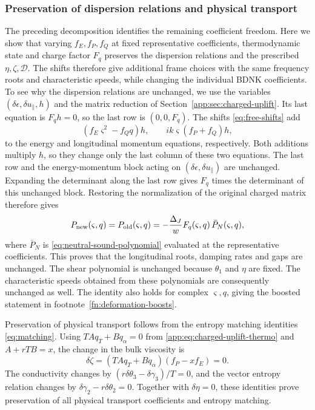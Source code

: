 \subsubsection*{Preservation of dispersion relations and physical transport}
The preceding decomposition identifies the remaining coefficient
freedom. Here we show that varying $f_E,f_P,f_Q$ at fixed representative
coefficients, thermodynamic state and charge factor $F_q$ preserves
the dispersion relations and the prescribed $\eta,\zeta,\mathcal D$.
The shifts therefore give additional frame choices with the same
frequency roots and characteristic speeds, while changing the
individual BDNK coefficients. To see why the dispersion relations are
unchanged, we use the variables $(\delta\epsilon,\delta u_\parallel,h)$
and the matrix reduction of Section~\ref{app:sec:charged-uplift}. Its last equation is $F_qh=0$,
so the last row is $(0,0,F_q)$. The shifts \eqref{eq:free-shifts} add
\begin{equation}
 (f_E\varsigma^2-f_Qq)h,\qquad
 ik\varsigma(f_P+f_Q)h,
\end{equation}
to the energy and longitudinal momentum equations, respectively.
Both additions multiply $h$, so they change only the last column of
these two equations. The last row and the energy-momentum block
acting on $(\delta\epsilon,\delta u_\parallel)$ are unchanged.
Expanding the determinant along the last row gives $F_q$ times the
determinant of this unchanged block. Restoring the normalization of the
original charged matrix therefore gives
\begin{equation}\label{app:eq:hierarchy-isospectral}
 P_{\rm new}(\varsigma,q)=P_{\rm old}(\varsigma,q)
   =-\frac{\Delta_J} w F_q(\varsigma,q)\,\bar P_N(\varsigma,q),
\end{equation}
where $\bar P_N$ is \eqref{eq:neutral-sound-polynomial} evaluated at the
representative coefficients. This proves that the longitudinal roots,
damping rates and gaps are unchanged. The shear polynomial is unchanged
because $\theta_1$ and $\eta$ are fixed. The characteristic speeds obtained
from these polynomials are consequently unchanged as well. The identity also holds for
complex $\varsigma,q$, giving the boosted statement in
footnote~\ref{fn:deformation-boosts}.

Preservation of physical transport follows from the
entropy matching identities \eqref{eq:matching}. Using
$TAq_T+Bq_\alpha=0$ from \eqref{app:eq:charged-uplift-thermo}
and $A+rTB=x$, the change in the bulk viscosity is
\begin{equation}
 \delta\zeta
 =(TAq_T+Bq_\alpha)(f_P-xf_E)=0.
\end{equation}
The conductivity changes by
$(r\delta\theta_3-\delta\gamma_3)/T=0$, and the vector entropy
relation changes by $\delta\gamma_2-r\delta\theta_2=0$.
Together with $\delta\eta=0$, these identities prove preservation of
all physical transport coefficients and entropy matching. 


